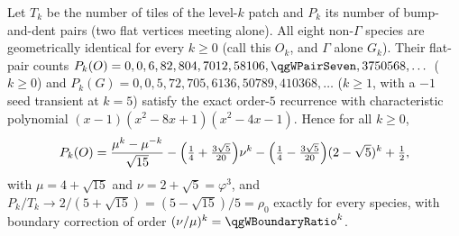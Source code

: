 

\begin{result}[\exact]\label{res:found-pairs}
Let $T_k$ be the number of tiles of the level-$k$ patch and $P_k$ its number of bump-and-dent pairs (two flat vertices meeting alone). All eight non-$\Gamma$ species are geometrically identical for every $k\ge0$ (call this $O_k$, and $\Gamma$ alone $G_k$). Their flat-pair counts $P_k(O)=0,0,6,82,804,7012,58106,\qgWPairSeven,3750568,\dots$ ($k\ge0$) and $P_k(G)=0,0,5,72,705,6136,50789,410368,\dots$ ($k\ge1$, with a $-1$ seed transient at $k=5$) satisfy the exact order-$5$ recurrence with characteristic polynomial $(x-1)(x^2-8x+1)(x^2-4x-1)$. Hence for all $k\ge0$,
\[
P_k(O)=\frac{\mu^k-\mu^{-k}}{\sqrt{15}}-\Bigl(\tfrac14+\tfrac{3\sqrt5}{20}\Bigr)\nu^k-\Bigl(\tfrac14-\tfrac{3\sqrt5}{20}\Bigr)(2-\sqrt5)^k+\tfrac12,
\]
with $\mu=4+\sqrt{15}$ and $\nu=2+\sqrt5=\varphi^3$, and $P_k/T_k\to 2/(5+\sqrt{15})=(5-\sqrt{15})/5=\rho_0$ exactly for every species, with boundary correction of order $(\nu/\mu)^k=\qgWBoundaryRatio^k$.
\end{result}
